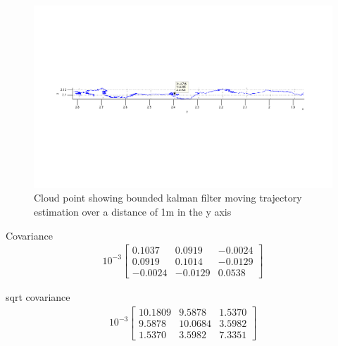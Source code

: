 \documentclass[]{article}
\begin{document}
{\begin{figure}[H]
	\begin{center}
		\includegraphics[width = \textwidth]{movingTraj.png}
	\end{center}
	\caption{Cloud point showing bounded kalman filter moving trajectory estimation over a distance of 1m in the y axis}
	\label{fig:stationary_trajectory}
\end{figure}

Covariance
\begin{align}
	10^{-3}
	\left[
	\begin{matrix}
		0.1037	& 0.0919	& -0.0024 \\
		0.0919	& 0.1014	& -0.0129 \\
		-0.0024	& -0.0129	& 0.0538
	\end{matrix}
	\right]
\end{align}

sqrt covariance
\begin{align}
	10^{-3}
	\left[
	\begin{matrix}
		10.1809	& 9.5878	& 1.5370 \\
		9.5878	& 10.0684	& 3.5982 \\
		1.5370	& 3.5982	& 7.3351
	\end{matrix}
	\right]
\end{align}
\clearpage



\nocite{*}

\printbibliography
% 



}
\end{document}
